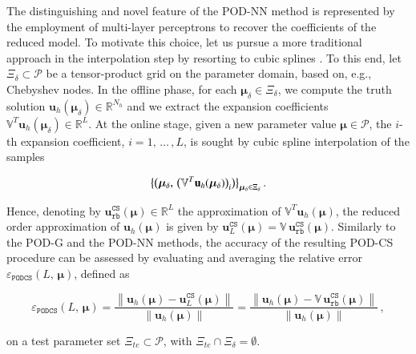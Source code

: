 \documentclass[longtitle]{elsarticle}
\numberwithin{equation}{section}
\theoremstyle{theorem}
\theoremstyle{definition}
\theoremstyle{remark}
\theoremstyle{proposition}
\numberwithin{figure}{section}
\newcommand{\norm}[1]{\left\lVert#1\right\rVert}
\newcommand{\bg}[1]{\boldsymbol{#1}}
\begin{document}
		The distinguishing and novel feature of the POD-NN method is represented by the employment of multi-layer perceptrons to recover the coefficients of the reduced model. To motivate this choice, let us pursue a more traditional approach in the interpolation step by resorting to cubic splines \cite{Deb78}. To this end, let $\Xi_{\delta} \subset \mathcal{P}$ be a tensor-product grid on the parameter domain, based on, e.g., Chebyshev nodes. In the offline phase, for each $\bg{\mu}_{\delta} \in \Xi_{\delta}$, we compute the truth solution $\mathbf{u}_h(\bg{\mu}_{\delta}) \in \mathbb{R}^{N_h}$ and we extract the expansion coefficients $\mathbb{V}^T \mathbf{u}_h(\bg{\mu}_{\delta}) \in \mathbb{R}^L$. At the online stage, given a new parameter value $\bg{\mu} \in \mathcal{P}$, the $i$-th expansion coefficient, $i = 1, \, \ldots \, , L$, is sought by cubic spline interpolation of the samples 
		\vspace*{-0.1cm}
		\begin{linenomath}\begin{equation*}
			\big\lbrace \big( \bg{\mu}_{\delta}, \, \big( \mathbb{V}^T \mathbf{u}_h(\bg{\mu}_{\delta}) \big)_i \big) \big\rbrace_{\bg{\mu}_{\delta} \in \Xi_{\delta}} \, . 
			\vspace*{-0.1cm}
		\end{equation*}\end{linenomath}
		Hence, denoting by $\mathbf{u}_{\texttt{rb}}^{\texttt{CS}}(\bg{\mu}) \in \mathbb{R}^L$ the approximation of $\mathbb{V}^T \mathbf{u}_h(\bg{\mu})$, the reduced order approximation of $\mathbf{u}_h(\bg{\mu})$ is given by $\mathbf{u}_L^{\texttt{CS}}(\bg{\mu}) = \mathbb{V} \, \mathbf{u}_{\texttt{rb}}^{\texttt{CS}}(\bg{\mu})$. Similarly to the POD-G and the POD-NN methods, the accuracy of the resulting POD-CS procedure can be assessed by evaluating and averaging the relative error $\varepsilon_{\texttt{PODCS}}^{}(L, \, \bg{\mu})$, defined as
		\vspace*{-0.1cm}
		\begin{linenomath}\begin{equation*}
			\varepsilon_{\texttt{PODCS}}^{}(L, \, \bg{\mu}) = \dfrac{\norm{\mathbf{u}_h(\bg{\mu}) - \mathbf{u}_L^{\texttt{CS}}(\bg{\mu})}}{\norm{\mathbf{u}_h(\bg{\mu})}} = \dfrac{\norm{\mathbf{u}_h(\bg{\mu}) - \mathbb{V} \, \mathbf{u}_{\texttt{rb}}^{\texttt{CS}}(\bg{\mu})}}{\norm{\mathbf{u}_h(\bg{\mu})}} \, ,
		\end{equation*}\end{linenomath}
		on a test parameter set $\Xi_{te} \subset \mathcal{P}$, with $\Xi_{te} \cap \Xi_{\delta} = \emptyset$.
				
\end{document}
